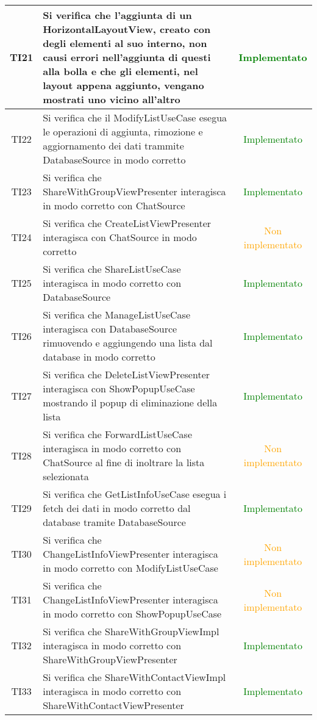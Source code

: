 \begin{center}
\begin{longtable}{|c|>{\centering}m{10cm}|c|}
		TI21 & Si verifica che l'aggiunta di un HorizontalLayoutView, creato con degli elementi al suo interno, non causi errori nell'aggiunta di questi alla bolla e che gli elementi, nel layout appena aggiunto, vengano mostrati uno vicino all'altro & \textcolor{Green}{Implementato}\\ \hline
		TI22 & Si verifica che il ModifyListUseCase esegua le operazioni di aggiunta, rimozione e aggiornamento dei dati trammite DatabaseSource in modo corretto & \textcolor{Green}{Implementato}\\ \hline
		TI23 & Si verifica che ShareWithGroupViewPresenter interagisca in modo corretto con ChatSource & \textcolor{Green}{Implementato}\\ \hline
		TI24 & Si verifica che CreateListViewPresenter interagisca con ChatSource in modo corretto & \textcolor{Orange}{Non implementato}\\ \hline
		TI25 & Si verifica che ShareListUseCase interagisca in modo corretto con DatabaseSource & \textcolor{Green}{Implementato}\\ \hline
		TI26 & Si verifica che ManageListUseCase interagisca con DatabaseSource rimuovendo e aggiungendo una lista dal database in modo corretto & \textcolor{Green}{Implementato}\\ \hline
		TI27 & Si verifica che DeleteListViewPresenter interagisca con ShowPopupUseCase mostrando il popup di eliminazione della lista & \textcolor{Green}{Implementato}\\ \hline
		TI28 & Si verifica che ForwardListUseCase interagisca in modo corretto con ChatSource al fine di inoltrare la lista selezionata & \textcolor{Orange}{Non implementato}\\ \hline
		TI29 & Si verifica che GetListInfoUseCase esegua i fetch dei dati in modo corretto dal database tramite DatabaseSource & \textcolor{Green}{Implementato}\\ \hline
		TI30 & Si verifica che ChangeListInfoViewPresenter interagisca in modo corretto con ModifyListUseCase & \textcolor{Orange}{Non implementato}\\ \hline
		TI31 & Si verifica che ChangeListInfoViewPresenter interagisca in modo corretto con ShowPopupUseCase & \textcolor{Orange}{Non implementato}\\ \hline
		TI32 & Si verifica che ShareWithGroupViewImpl interagisca in modo corretto con ShareWithGroupViewPresenter & \textcolor{Green}{Implementato}\\ \hline
		TI33 & Si verifica che ShareWithContactViewImpl interagisca in modo corretto con ShareWithContactViewPresenter & \textcolor{Green}{Implementato}\\ \hline

\end{longtable}
\end{center}
